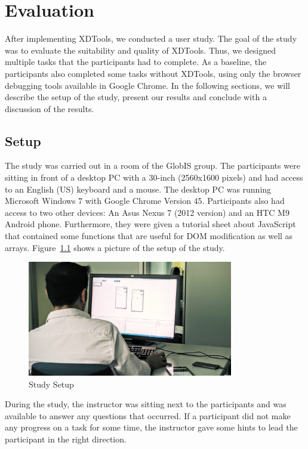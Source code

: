 \chapter{Evaluation}

After implementing XDTools, we conducted a user study. The goal of the study was to evaluate the suitability and quality of XDTools. Thus, we designed multiple tasks that the participants had to complete. As a baseline, the participants also completed some tasks without XDTools, using only the browser debugging tools available in Google Chrome. In the following sections, we will describe the setup of the study, present our results and conclude with a discussion of the results.

\section{Setup}

The study was carried out in a room of the GlobIS group. The participants were sitting in front of a desktop PC with a 30-inch (2560x1600 pixels) and had access to an English (US) keyboard and a mouse. The desktop PC was running Microsoft Windows 7 with Google Chrome Version 45. Participants also had access to two other devices: An Asus Nexus 7 (2012 version) and an HTC M9 Android phone. Furthermore, they were given a tutorial sheet about JavaScript that contained some functions that are useful for DOM modification as well as arrays. Figure~\ref{fig:study_setup} shows a picture of the setup of the study.

\begin{figure}[H]
  \centering
    \includegraphics[width=0.8\textwidth]{images/study_setup2.png}
	\caption[Photo: Study setup]{Study Setup}
	\label{fig:study_setup}
\end{figure}

During the study, the instructor was sitting next to the participants and was available to answer any questions that occurred. If a participant did not make any progress on a task for some time, the instructor gave some hints to lead the participant in the right direction.

